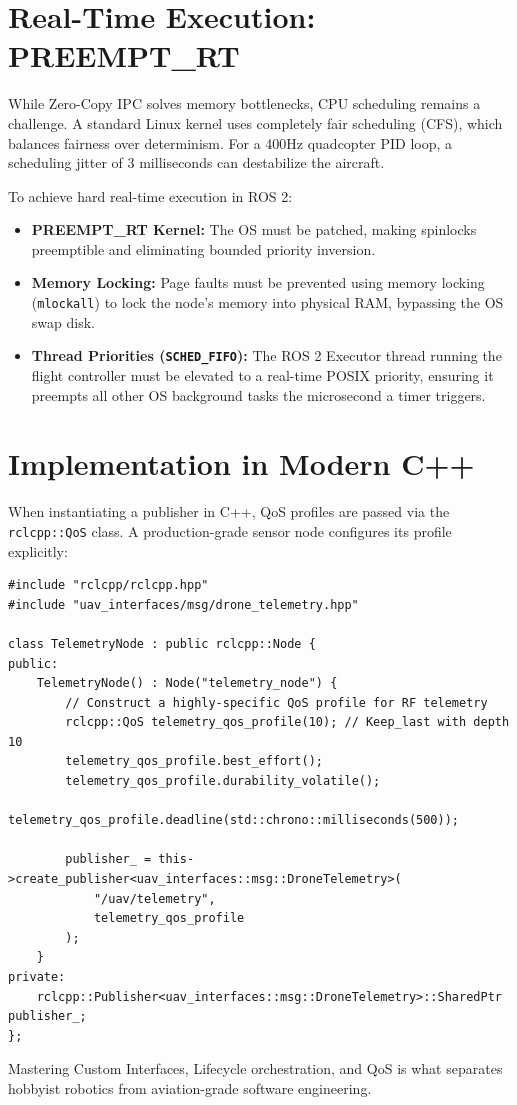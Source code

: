 \documentclass{article}
\begin{document}
\section{Real-Time Execution: PREEMPT\_RT}
While Zero-Copy IPC solves memory bottlenecks, CPU scheduling remains a challenge. 
A standard Linux kernel uses completely fair scheduling (CFS), which balances fairness over determinism. 
For a 400Hz quadcopter PID loop, a scheduling jitter of 3 milliseconds can destabilize the aircraft.

To achieve hard real-time execution in ROS 2:
\begin{itemize}
    \item \textbf{PREEMPT\_RT Kernel:} The OS must be patched, making spinlocks preemptible and eliminating bounded priority inversion.
    \item \textbf{Memory Locking:} Page faults must be prevented using memory locking (\texttt{mlockall}) to lock the node's memory into physical RAM, bypassing the OS swap disk.
    \item \textbf{Thread Priorities (\texttt{SCHED\_FIFO}):} The ROS 2 Executor thread running the flight controller must be elevated to a real-time POSIX priority, ensuring it preempts all other OS background tasks the microsecond a timer triggers.
\end{itemize}

\section{Implementation in Modern C++}
When instantiating a publisher in C++, QoS profiles are passed via the \texttt{rclcpp::QoS} class. 
A production-grade sensor node configures its profile explicitly:

\begin{verbatim}
#include "rclcpp/rclcpp.hpp"
#include "uav_interfaces/msg/drone_telemetry.hpp"

class TelemetryNode : public rclcpp::Node {
public:
    TelemetryNode() : Node("telemetry_node") {
        // Construct a highly-specific QoS profile for RF telemetry
        rclcpp::QoS telemetry_qos_profile(10); // Keep_last with depth 10
        telemetry_qos_profile.best_effort();
        telemetry_qos_profile.durability_volatile();
        telemetry_qos_profile.deadline(std::chrono::milliseconds(500));

        publisher_ = this->create_publisher<uav_interfaces::msg::DroneTelemetry>(
            "/uav/telemetry", 
            telemetry_qos_profile
        );
    }
private:
    rclcpp::Publisher<uav_interfaces::msg::DroneTelemetry>::SharedPtr publisher_;
};
\end{verbatim}

Mastering Custom Interfaces, Lifecycle orchestration, and QoS is what separates hobbyist robotics from aviation-grade software engineering.
\end{document}
